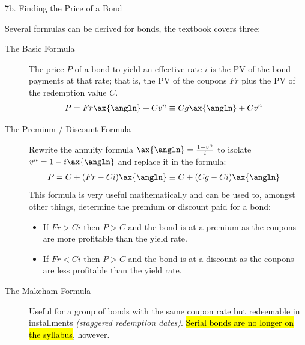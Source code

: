 \begin{CHPT_SUMM_AUTO}[label = {L.-7b}]{7b. Finding the Price of a Bond}
\tcbline

Several formulas can be derived for bonds, the textbook covers three:

\begin{description}
	\item[The Basic Formula]	The price $P$ of a bond to yield an effective rate $i$ is the PV of the bond payments at that rate; that is, the PV of the coupons $Fr$ plus the PV of the redemption value $C$.
		\begin{align*}
		P
		&=	Fr \ax{\angln}	+	Cv^{n}
		\equiv	Cg \ax{\angln}	+	Cv^{n}
		\end{align*}
	\item[The Premium / Discount Formula]	Rewrite the annuity formula $\ax{\angln} = \frac{1 - v^{n}}{i}$ to isolate $v^{n} = 1 - i\ax{\angln}$ and replace it in the formula:
		\begin{align*}
		P
		&=	C + (Fr - Ci) \ax{\angln}
		\equiv	C + (Cg - Ci) \ax{\angln}
		\end{align*}
		This formula is very useful mathematically and can be used to, amongst other things, determine the premium or discount paid for a bond:
			\begin{itemize}[leftmargin = *]
			\item	If $Fr > Ci$ then $P > C$ and the bond is at a premium as the coupons are more profitable than the yield rate.
			\item	If $Fr < Ci$ then $P > C$ and the bond is at a discount as the coupons are less profitable than the yield rate.
			\end{itemize}
	\item[The Makeham Formula]	Useful for a group of bonds with the same coupon rate but redeemable in installments \textit{(staggered redemption dates)}. \hl{Serial bonds are no longer on the syllabus}, however.

\end{description}
\end{CHPT_SUMM_AUTO}

